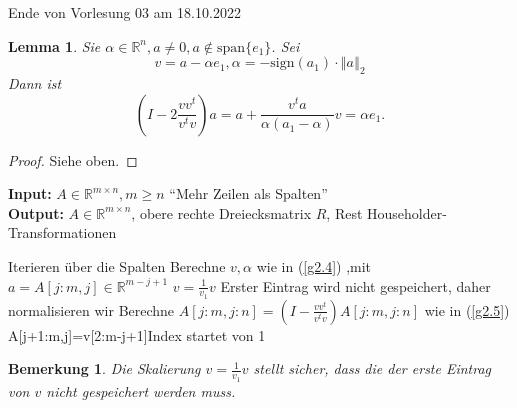 \documentclass{book}
\newtheorem{lemma}[algorithm]{Lemma}
\newtheorem{remark}[algorithm]{Bemerkung}
\def\R{\mathbb{R}}
\begin{document}
            \noindent
            \xrfill[0.7ex]{1pt}Ende von Vorlesung 03 am 18.10.2022\xrfill[0.7ex]{1pt}
            
            \begin{lemma}\label{l2.18}
                Sie $\alpha\in\R^n,a\neq 0,a\notin\text{span}\{e_1\}$. 
                Sei \begin{equation}\label{g2.4}
                    v=a-\alpha e_1,\alpha =-\text{sign}(a_1)\cdot \left\Vert a \right\Vert_2
                \end{equation} %
                Dann ist
                \begin{equation}\label{g2.5}
                    \left(I-2\frac{vv^t}{v^tv}\right)a=a+\frac{v^ta}{\alpha(a_1-\alpha)}v=\alpha e_1.
                \end{equation}
            \end{lemma}

            \begin{proof}
                Siehe oben.
            \end{proof}

            \begin{algorithm}[H]\label{a2.19}
                \caption{}
                \textbf{Input:} $A\in\R^{m\times n},m\geq n$ ``Mehr Zeilen als Spalten''\\
                \textbf{Output:} $A\in\R^{m\times n}$, obere rechte Dreiecksmatrix $R$, Rest Householder-Transformationen
                \begin{algorithmic}
                 \Comment Iterieren über die Spalten
                    \State Berechne $v,\alpha$ wie in (\ref{g2.4}) ,mit $a=A[j:m,j]\in\R^{m-j+1}$
                    \State $v=\frac{1}{v_1}v$ \Comment Erster Eintrag wird nicht gespeichert, daher normalisieren wir
                    \State Berechne $A[j:m,j:n]=\left(I-\frac{vv^t}{v^tv}\right)A[j:m,j:n]$ wie in (\ref{g2.5})
                        \State A[j+1:m,j]=v[2:m-j+1]\Comment Index startet von 1 
                    \EndIf
                \EndFor
                \end{algorithmic}
            \end{algorithm}

            \begin{remark}\label{b2.20}
                Die Skalierung $v=\frac{1}{v_1}v$ stellt sicher, dass die der erste Eintrag von $v$ nicht gespeichert werden muss.
            \end{remark}
\end{document}
